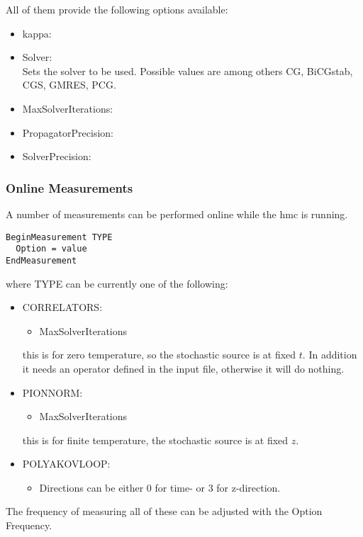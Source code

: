 All of them provide the following options available:
\begin{itemize}
\item {\ttfamily kappa}:
\item {\ttfamily Solver}:\\
  Sets the solver to be used. Possible values are among others
  {\ttfamily CG, BiCGstab, CGS, GMRES, PCG}.
\item {\ttfamily MaxSolverIterations}:
\item {\ttfamily PropagatorPrecision}:
\item {\ttfamily SolverPrecision}:
\end{itemize}

\subsubsection{Online Measurements}

A number of measurements can be performed online while the hmc is
running. 
\begin{verbatim}
BeginMeasurement TYPE
  Option = value
EndMeasurement
\end{verbatim}
where {\ttfamily TYPE} can be currently one of the following:
\begin{itemize}
\item {\ttfamily CORRELATORS}:
  \begin{itemize}
  \item {\ttfamily MaxSolverIterations}
  \end{itemize}
  this is for zero temperature, so the stochastic source is at fixed
  $t$. In addition it needs an operator defined in the input file,
  otherwise it will do nothing.
\item {\ttfamily PIONNORM}:
  \begin{itemize}
  \item {\ttfamily MaxSolverIterations}
  \end{itemize}
  this is for finite temperature, the stochastic source is at fixed $z$.

\item {\ttfamily POLYAKOVLOOP}:
  \begin{itemize}
  \item {\ttfamily Directions} can be either $0$ for time- or $3$ for z-direction.
  \end{itemize}
\end{itemize}
The frequency of measuring all of these can be adjusted with the
Option {\ttfamily Frequency}. 


